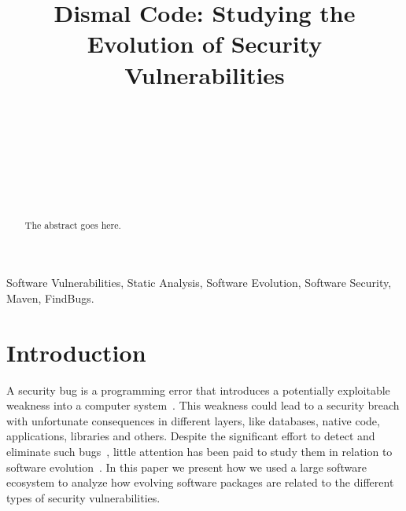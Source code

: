 \documentclass[conference]{IEEEtran}
\begin{document}
\title{Dismal Code: Studying the Evolution of Security Vulnerabilities}

\author{
\\
\and
{}
\\
\and
{}
\\
\and
{}
\\
\and
{}
}

\maketitle

\begin{abstract}
The abstract goes here.
\end{abstract}

\begin{IEEEkeywords}
Software Vulnerabilities, Static Analysis, Software Evolution, Software
Security, Maven, FindBugs.
\end{IEEEkeywords}

\IEEEpeerreviewmaketitle

\section{Introduction}

A security bug is a programming error that introduces a potentially
exploitable weakness into a computer system~\cite{SSL12, TJBD11}. This weakness could lead to a
security breach with unfortunate consequences in different layers, like databases,
native code, applications, libraries and others. Despite the significant
effort to detect and eliminate such bugs~\cite{SZ12}, little attention has been paid to
study them in relation to software evolution~\cite{L96, LRWPT97, IB06, RGMA06}.
In this paper we present how we used a large software ecosystem to analyze
how evolving software packages are related to the different types of security
vulnerabilities.
\end{document}
